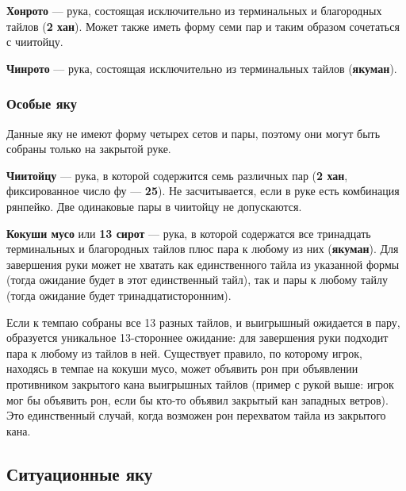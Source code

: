  \hfill {}

\textbf{Хонрото} --- рука, состоящая исключительно из терминальных и благородных тайлов (\textbf{2 хан}). Может также иметь форму семи пар и таким образом сочетаться с чиитойцу.

 \hfill {}

\textbf{Чинрото} --- рука, состоящая исключительно из терминальных тайлов (\textbf{якуман}).

 \hfill {}

\subsubsection{Особые яку}

Данные яку не имеют форму четырех сетов и пары, поэтому они могут быть собраны только на закрытой руке.

\textbf{Чиитойцу} --- рука, в которой содержится семь различных пар (\textbf{2 хан}, фиксированное число фу --- \textbf{25}). Не засчитывается, если в руке есть комбинация рянпейко. Две одинаковые пары в чиитойцу не допускаются.


\textbf{Кокуши мусо} или \textbf{13 сирот} --- рука, в которой содержатся все тринадцать терминальных и благородных тайлов плюс пара к любому из них (\textbf{якуман}). Для завершения руки может не хватать как единственного тайла из указанной формы (тогда ожидание будет в этот единственный тайл), так и пары к любому тайлу (тогда ожидание будет тринадцатисторонним).

Если к темпаю собраны все 13 разных тайлов, и выигрышный ожидается в пару, образуется уникальное 13-стороннее ожидание: для завершения руки подходит пара к любому из тайлов в ней.  Существует правило, по которому игрок, находясь в темпае на кокуши мусо, может объявить рон при объявлении противником закрытого кана выигрышных тайлов (пример с рукой выше: игрок мог бы объявить рон, если бы кто-то объявил закрытый кан западных ветров). Это единственный случай, когда возможен рон перехватом тайла из закрытого кана.


\subsection{Ситуационные яку}

